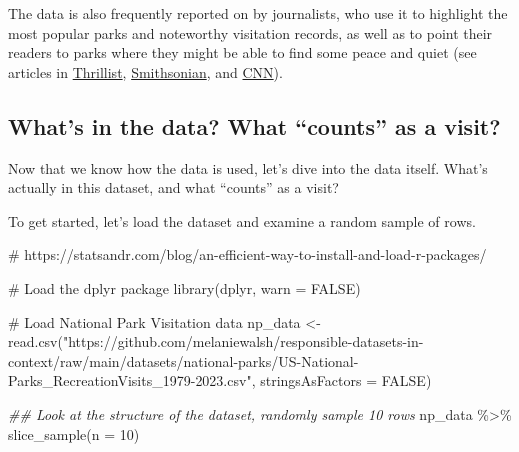 \documentclass[
  letterpaper,
  DIV=11,
  numbers=noendperiod]{scrartcl}
\newenvironment{Shaded}{\begin{snugshade}}{\end{snugshade}}
\newcommand{\AttributeTok}[1]{\textcolor[rgb]{0.40,0.45,0.13}{#1}}
\newcommand{\CommentTok}[1]{\textcolor[rgb]{0.37,0.37,0.37}{#1}}
\newcommand{\ConstantTok}[1]{\textcolor[rgb]{0.56,0.35,0.01}{#1}}
\newcommand{\DecValTok}[1]{\textcolor[rgb]{0.68,0.00,0.00}{#1}}
\newcommand{\DocumentationTok}[1]{\textcolor[rgb]{0.37,0.37,0.37}{\textit{#1}}}
\newcommand{\FunctionTok}[1]{\textcolor[rgb]{0.28,0.35,0.67}{#1}}
\newcommand{\NormalTok}[1]{\textcolor[rgb]{0.00,0.23,0.31}{#1}}
\newcommand{\OtherTok}[1]{\textcolor[rgb]{0.00,0.23,0.31}{#1}}
\newcommand{\SpecialCharTok}[1]{\textcolor[rgb]{0.37,0.37,0.37}{#1}}
\newcommand{\StringTok}[1]{\textcolor[rgb]{0.13,0.47,0.30}{#1}}
\begin{document}
The data is also frequently reported on by journalists, who use it to
highlight the most popular parks and noteworthy visitation records, as
well as to point their readers to parks where they might be able to find
some peace and quiet (see articles in
\href{https://www.thrillist.com/news/nation/most-visited-national-parks-ranked-nps}{Thrillist},
\href{https://www.smithsonianmag.com/smart-news/most-and-least-popular-national-parks-2023-180983850/}{Smithsonian},
and
\href{https://www.cnn.com/travel/article/most-visited-us-national-park-sites-2022/index.html}{CNN}).

\subsection{What's in the data? What ``counts'' as a
visit?}\label{whats-in-the-data-what-counts-as-a-visit}

Now that we know how the data is used, let's dive into the data itself.
What's actually in this dataset, and what ``counts'' as a visit?

To get started, let's load the dataset and examine a random sample of
rows.

\begin{Shaded}
\begin{Highlighting}[]
\CommentTok{\# https://statsandr.com/blog/an{-}efficient{-}way{-}to{-}install{-}and{-}load{-}r{-}packages/}

\CommentTok{\# Load the dplyr package}
\FunctionTok{library}\NormalTok{(dplyr, }\AttributeTok{warn =} \ConstantTok{FALSE}\NormalTok{)}

\CommentTok{\# Load National Park Visitation data}
\NormalTok{np\_data }\OtherTok{\textless{}{-}} \FunctionTok{read.csv}\NormalTok{(}\StringTok{"https://github.com/melaniewalsh/responsible{-}datasets{-}in{-}context/raw/main/datasets/national{-}parks/US{-}National{-}Parks\_RecreationVisits\_1979{-}2023.csv"}\NormalTok{, }\AttributeTok{stringsAsFactors =} \ConstantTok{FALSE}\NormalTok{)}

\DocumentationTok{\#\# Look at the structure of the dataset, randomly sample 10 rows}
\NormalTok{np\_data }\SpecialCharTok{\%\textgreater{}\%} \FunctionTok{slice\_sample}\NormalTok{(}\AttributeTok{n =} \DecValTok{10}\NormalTok{)}
\end{Highlighting}
\end{Shaded}
\end{document}
